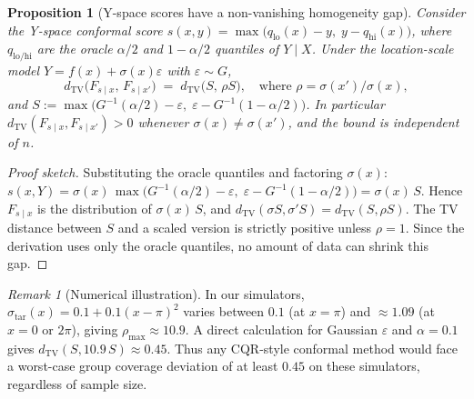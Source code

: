 \documentclass[11pt]{article}
\newtheorem{proposition}[theorem]{Proposition}
\theoremstyle{remark}
\newtheorem{remark}[theorem]{Remark}
\begin{document}
\begin{proposition}[Y-space scores have a non-vanishing homogeneity gap]
\label{prop:tg3}
Consider the Y-space conformal score
$s(x,y) = \max\bigl(q_{\mathrm{lo}}(x) - y,\;
y - q_{\mathrm{hi}}(x)\bigr)$,
where $q_{\mathrm{lo/hi}}$ are the oracle $\alpha/2$ and
$1-\alpha/2$ quantiles of $Y\mid X$. Under the location-scale model
$Y = f(x) + \sigma(x)\varepsilon$ with $\varepsilon \sim G$,
\begin{equation}
\label{eq:tg3}
  d_{\mathrm{TV}}\bigl(F_{s\mid x},\, F_{s\mid x'}\bigr)
  \;=\; d_{\mathrm{TV}}\bigl(S,\,\rho S\bigr),
  \quad\text{where } \rho = \sigma(x')/\sigma(x),
\end{equation}
and $S := \max\bigl(G^{-1}(\alpha/2) - \varepsilon,\;
\varepsilon - G^{-1}(1-\alpha/2)\bigr)$. In particular
$d_{\mathrm{TV}}(F_{s\mid x}, F_{s\mid x'}) > 0$ whenever
$\sigma(x) \ne \sigma(x')$, and the bound is \emph{independent of $n$}.
\end{proposition}

\begin{proof}[Proof sketch]
Substituting the oracle quantiles and factoring $\sigma(x)$:
$s(x, Y) = \sigma(x)\,\max\bigl(G^{-1}(\alpha/2) - \varepsilon,\;
\varepsilon - G^{-1}(1-\alpha/2)\bigr) = \sigma(x)\,S$. Hence
$F_{s\mid x}$ is the distribution of $\sigma(x)\,S$, and
$d_{\mathrm{TV}}(\sigma S, \sigma' S) = d_{\mathrm{TV}}(S, \rho S)$.
The TV distance between $S$ and a scaled version is strictly positive
unless $\rho = 1$. Since the derivation uses only the oracle
quantiles, no amount of data can shrink this gap.
\end{proof}

\begin{remark}[Numerical illustration]
\label{rem:tg3-numerical}
In our simulators,
$\sigma_{\mathrm{tar}}(x) = 0.1 + 0.1(x-\pi)^2$ varies between $0.1$
(at $x=\pi$) and $\approx 1.09$ (at $x=0$ or $2\pi$), giving
$\rho_{\max} \approx 10.9$. A direct calculation for Gaussian
$\varepsilon$ and $\alpha = 0.1$ gives
$d_{\mathrm{TV}}(S, 10.9\,S) \approx 0.45$. Thus any CQR-style
conformal method would face a worst-case group coverage deviation of
at least $0.45$ on these simulators, regardless of sample size.
\end{remark}
\end{document}
